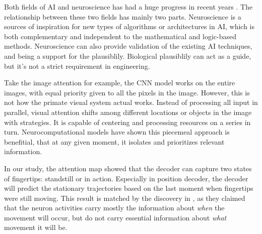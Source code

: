 Both fields of AI and neuroscience has had a huge progress in recent years \cite{hassabis2017neuroscience}.
The relationship between these two fields has mainly two parts.
Neuroscience is a sources of inspiration for new types of algorithms or architectures in AI,
which is both complementary and independent to the mathematical and logic-based methods.
Neuroscience can also provide validation of the existing AI techniques,
and being a support for the plausiblily.
Biological plausiblily can act as a guide, but it's not a strict requirement in engineering.


Take the image attention for example, 
the CNN model works on the entire images, with equal priority given to all the pixels in the image.
However, this is not how the primate visual system actual works.
Instead of processing all input in parallel, 
visual attention shifts among different locations or objects in the image with strategies.
It is capable of centering and processing resources on a series in turn.
Neurocomputational models have shown this piecemeal approach is benefitial,
that at any given moment, it isolates and prioritizes relevant information.

In our study,
the attention map showed that the decoder can capture two states of fingertips: standstill or in action.
Especially in position decoder, 
the decoder will predict the stationary trajectories based on the last moment when fingertips were still moving.
This result is matched by the discovery in \cite{kaufman2016largest},
as they claimed that the neuron activities carry mostly the information about \textit{when} the movement will occur,
but do not carry essential information about \textit{what} movement it will be.






